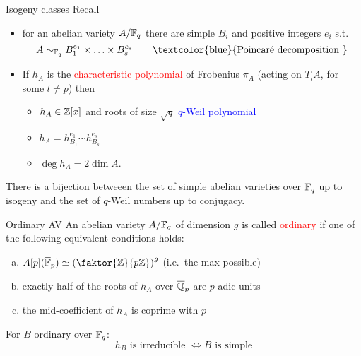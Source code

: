 \documentclass[usenames,dvipsnames,handout]{beamer}
\newcommand{\red}[1]{\textcolor{red}{#1}}
\newcommand{\blue}[1]{\textcolor{blue}{#1}}
\begin{document}
\begin{frame}{ Isogeny classes }
Recall
\begin{itemize}
 \item for an abelian variety $A/\mathbb{F}_q$ there are simple $B_i$ and positive integers $e_i$ s.t.
  \[ A \sim_{\F_q} B_1^{e_1}\times \ldots \times B_s^{e_s} \qquad\text{\blue{Poincar\'e decomposition }}\] 
 \pause \item If $h_A$ is the \red{characteristic polynomial} of Frobenius $\pi_A$ (acting on $T_lA$, for some $l\neq p$) then
    \begin{itemize}
      \pause \item $h_A\in \mathbb{Z}[x]$ and roots of size $\sqrt{q}$ \qquad\blue{$q$-Weil polynomial}
      \pause \item $ h_A = h_{B_1}^{e_1}\cdots h_{B_s}^{e_s} $
      \pause \item $\deg h_A = 2\dim A$.
    \end{itemize}
\end{itemize}
  \pause \begin{thm}
   There is a bijection betweeen the set of simple abelian varieties over $\mathbb{F}_q$ up to isogeny and the set of $q$-Weil numbers up to conjugacy.
  \end{thm}
\end{frame}

\begin{frame}{ Ordinary AV }
  An abelian variety $A/\mathbb{F}_q$ of dimension $g$ is called \red{ordinary} if one of the following equivalent conditions holds:
  \begin{enumerate}[(a)]
   \pause \item $A[p](\overline{\F}_p) \simeq \left(\faktor{\Z}{p\Z}\right)^g$ (i.e.~the max possible)
   \pause \item exactly half of the roots of $h_A$ over $\overline{\mathbb{Q}}_p$ are $p$-adic units
   \pause \item the mid-coefficient of $h_A$ is coprime with $p$
  \end{enumerate}
  \pause
  \begin{prop}
  For $B$ ordinary over $\mathbb{F}_q$:
   \[ h_B \text{ is irreducible } \Longleftrightarrow B \text{ is simple}\]
  \end{prop}
\end{frame}
\end{document}

